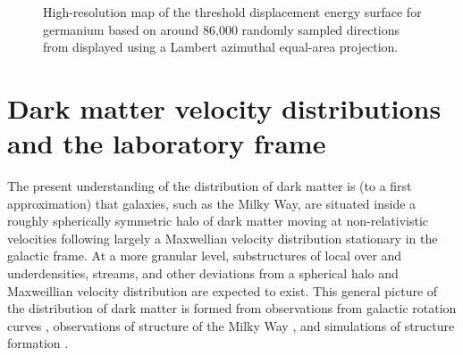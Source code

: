 \documentclass[b5paper, 10pt, twoside]{book}
\newcommand{\infernoaxiscolor}{scp-grey-light-3}
\begin{document}
\begin{figure}
    \caption{High-resolution map of the threshold displacement energy surface for germanium based on around 86,000 randomly sampled directions from \textcite{KadribasicEtAl2018} displayed using a Lambert azimuthal equal-area projection.}
    \label{fig:ge-threshold-energy}
\end{figure}

\chapter{Dark matter velocity distributions and the laboratory frame}
\label{chap:dist}

The present understanding of the distribution of dark matter is (to a first approximation) that galaxies, such as the Milky Way, are situated inside a roughly spherically symmetric halo of dark matter moving at non-relativistic velocities following largely a Maxwellian velocity distribution stationary in the galactic frame. At a more granular level, substructures of local over and underdensities, streams, and other deviations from a spherical halo and Maxweillian velocity distribution are expected to exist. This general picture of the distribution of dark matter is formed from observations from galactic rotation curves \parencites{SofueEtAl1999, LelliMcGaughSchombert2016}, observations of structure of the Milky Way \parencites{PortailEtAl2016, LabiniEtAl2023, BelokurovEtAl2018, KruijssenEtAl2018, HelmiEtAl2018}, and simulations of structure formation \parencites{VogelsbergerEtAl2014, WangEtAl2015, KlypinEtAl2016, SpringelEtAl2017, SpringelEtAl2008, DiemandEtAl2008, StadelEtAl2009, vandenBoschOgiya2018}.
\end{document}
